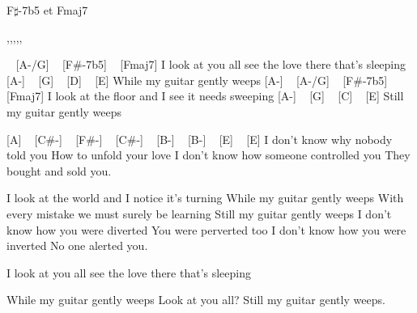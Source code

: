 
F$\sharp$-7b5 et Fmaj7
\begin{tabline}{1}{}{}{,,,,,}

\end{tabline}



\begin{guitar}
[A-] ~ [A-/G] ~ [F#-7b5] ~ [Fmaj7]
I look at you all see the love there that's sleeping
[A-] ~ [G] ~ [D] ~ [E]
While my guitar gently weeps
[A-] ~ [A-/G] ~ [F#-7b5] ~ [Fmaj7]
I look at the floor and I see it needs sweeping
[A-] ~ [G] ~ [C] ~ [E]
Still my guitar gently weeps

[A] ~ [C#-] ~ [F#-] ~ [C#-] ~ [B-] ~ [B-] ~ [E] ~ [E]
I don't know why nobody told you
How to unfold your love
I don't know how someone controlled you
They bought and sold you.

I look at the world and I notice it's turning
While my guitar gently weeps
With every mistake we must surely be learning
Still my guitar gently weeps
I don't know how you were diverted
You were perverted too
I don't know how you were inverted
No one alerted you.

I look at you all see the love there that's sleeping

While my guitar gently weeps
Look at you all?
Still my guitar gently weeps. 

\end{guitar}
